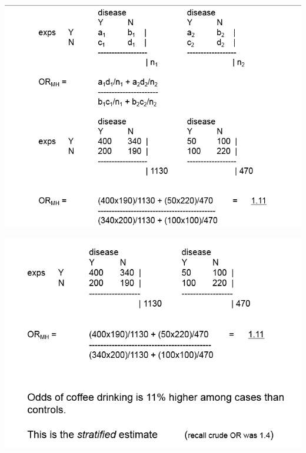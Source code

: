 \documentclass[ignorenonframetext,]{beamer}
\begin{document}
\begin{frame}

\includegraphics{stratum2.png}

\end{frame}

\begin{frame}

\includegraphics{stratum3.png}

\end{frame}
\end{document}
